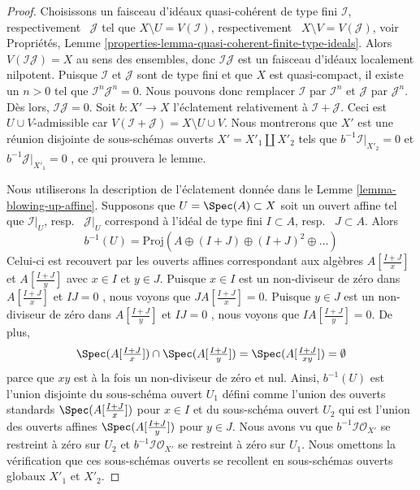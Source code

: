 \begin{proof}
Choisissons un faisceau d'idéaux quasi-cohérent de type fini  $\mathcal{I}$,
respectivement \ $\mathcal{J}$  tel que  $X \setminus U = V(\mathcal{I})$, respectivement
\ $X \setminus V = V(\mathcal{J})$, voir Propriétés, Lemme  \ref{properties-lemma-quasi-coherent-finite-type-ideals}. Alors  $V(\mathcal{I}\mathcal{J}) = X$ 
au sens des ensembles, donc  $\mathcal{I}\mathcal{J}$  est un faisceau d'idéaux localement
nilpotent. Puisque  $\mathcal{I}$  et  $\mathcal{J}$  sont de type fini et que
 $X$  est quasi-compact, il existe un  $n > 0$  tel que  $\mathcal{I}^n \mathcal{J}^n = 0$.
 Nous pouvons donc remplacer  $\mathcal{I}$  par  $\mathcal{I}^n$  et  $\mathcal{J}$  par
 $\mathcal{J}^n$. Dès lors,  $\mathcal{I} \mathcal{J} = 0$. Soit  $b : X' \to X$  l'éclatement relativement à  $\mathcal{I} + \mathcal{J}$.
Ceci est  $U \cup V$-admissible car  $V(\mathcal{I} + \mathcal{J}) = X \setminus U \cup V$. Nous montrerons que
 $X'$  est une réunion disjointe de sous-schémas ouverts  $X' = X'_1 \amalg X'_2$  tels
que  $b^{-1}\mathcal{I}|_{X'_2} = 0$  et  $b^{-1}\mathcal{J}|_{X'_1} = 0$ , ce qui prouvera le lemme.

\medskip\noindent
Nous utiliserons la description de l'éclatement donnée dans le Lemme  \ref{lemma-blowing-up-affine}.
Supposons que  $U = \Spec(A) \subset X$  soit un ouvert affine tel que  $\mathcal{I}|_U$, resp.
\ $\mathcal{J}|_U$  correspond à l'idéal de type fini  $I \subset A$, resp.
\ $J \subset A$. Alors
$$
b^{-1}(U) = \text{Proj}(A \oplus (I + J) \oplus (I + J)^2 \oplus \ldots)
$$
Celui-ci est recouvert par les ouverts affines correspondant aux algèbres  $A[\frac{I + J}{x}]$  et
 $A[\frac{I + J}{y}]$  avec  $x \in I$  et  $y \in J$. Puisque  $x \in I$  est un
non-diviseur de zéro dans  $A[\frac{I + J}{x}]$  et  $IJ = 0$ , nous voyons que
 $J A[\frac{I + J}{x}] = 0$. Puisque  $y \in J$  est un non-diviseur de zéro dans  $A[\frac{I + J}{y}]$ 
et  $IJ = 0$ , nous voyons que  $I A[\frac{I + J}{y}] = 0$. De plus,
$$
\Spec(A[\textstyle{\frac{I + J}{x}}]) \cap
\Spec(A[\textstyle{\frac{I + J}{y}}]) =
\Spec(A[\textstyle{\frac{I + J}{xy}}]) = \emptyset
$$
parce que  $xy$  est à la fois un non-diviseur de zéro et nul. Ainsi,
 $b^{-1}(U)$  est l'union disjointe du sous-schéma ouvert  $U_1$  défini comme
l'union des ouverts standards  $\Spec(A[\frac{I + J}{x}])$  pour  $x \in I$  et du sous-schéma
ouvert  $U_2$  qui est l'union des ouverts affines  $\Spec(A[\frac{I + J}{y}])$  pour
 $y \in J$. Nous avons vu que  $b^{-1}\mathcal{I}\mathcal{O}_{X'}$  se restreint à zéro sur  $U_2$ 
et  $b^{-1}\mathcal{I}\mathcal{O}_{X'}$  se restreint à zéro sur  $U_1$. Nous omettons la
vérification que ces sous-schémas ouverts se recollent en sous-schémas ouverts
globaux  $X'_1$  et  $X'_2$.
\end{proof}

